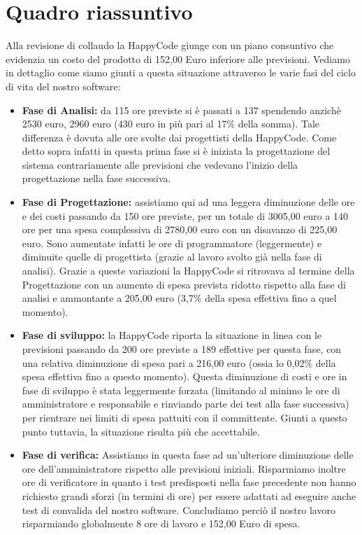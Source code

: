 \chapter{Quadro riassuntivo}
Alla revisione di collaudo la HappyCode giunge con un piano consuntivo che evidenzia un costo del prodotto di 152,00 Euro inferiore alle previsioni. Vediamo in dettaglio come siamo giunti a questa situazione attraverso le varie fasi del ciclo di vita del nostro software:
\begin{itemize}
\item \textbf{Fase di Analisi:} da 115 ore previste si \`e passati a 137 spendendo anzich\`e 2530 euro, 2960 euro (430 euro in pi\`u pari al 17\% della somma). Tale differenza \`e dovuta alle ore svolte dai progettisti della HappyCode. Come detto sopra infatti in questa prima fase si \`e iniziata la progettazione del sistema contrariamente alle previsioni che vedevano l'inizio della progettazione nella fase successiva.
\item \textbf{Fase di Progettazione:} assistiamo qui ad una leggera diminuzione delle ore e dei costi passando da 150 ore previste, per un totale di 3005,00 euro a 140 ore per una spesa complessiva di 2780,00 euro con un disavanzo di 225,00 euro. Sono aumentate infatti le ore di programmatore (leggermente) e diminuite quelle di progettista (grazie al lavoro svolto gi\`a nella fase di analisi). Grazie a queste variazioni la HappyCode si ritrovava al termine della Progettazione con un aumento di spesa prevista ridotto rispetto alla fase di 
analisi e ammontante a 205,00 euro (3,7\% della spesa effettiva fino a quel momento).
\item \textbf{Fase di sviluppo:} la HappyCode riporta la situazione in linea con le previsioni passando da 200 ore previste a 189 effettive per questa fase, con una relativa diminuzione di spesa pari a 216,00 euro (ossia lo 0,02\% della spesa effettiva fino a questo momento). Questa diminuzione di costi e ore in fase di sviluppo \`e stata leggermente forzata (limitando al minimo le ore di amministratore e responsabile e rinviando parte dei test alla fase successiva) per rientrare nei limiti di spesa pattuiti con il committente. Giunti a questo punto tuttavia, la situazione risulta pi\`u che accettabile.
\item \textbf{Fase di verifica:} Assistiamo in questa fase ad un'ulteriore diminuzione delle ore dell'amministratore rispetto alle previsioni iniziali. Risparmiamo inoltre ore di verificatore in quanto i test predisposti nella fase precedente non hanno richiesto grandi sforzi (in termini di ore) per essere adattati ad eseguire anche test di convalida del nostro software. Concludiamo perci\`o il nostro lavoro risparmiando globalmente 8 ore di lavoro e 152,00 Euro di spesa.
\end{itemize}

